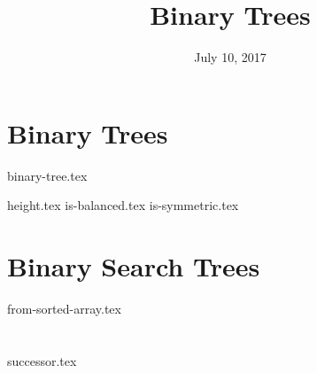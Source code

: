 \documentclass{exam}
\title{Binary Trees}
\date{July 10, 2017}
\begin{document}
\maketitle

\section{Binary Trees}
{binary-tree.tex}
\begin{questions}
{height.tex}
{is-balanced.tex}
\clearpage
{}\vspace*{-2em}
{is-symmetric.tex}
\end{questions}

\clearpage

\section{Binary Search Trees}
\begin{questions}
{from-sorted-array.tex}
\end{questions}

\clearpage

\section{}
\begin{questions}
{successor.tex}
\end{questions}
\end{document}
